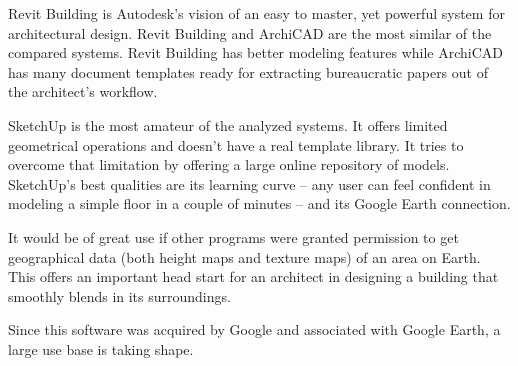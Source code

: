 Revit Building is Autodesk's vision of an easy to master,
yet powerful system for architectural design.
Revit Building and ArchiCAD are the most similar of the compared systems.
Revit Building has better modeling features while ArchiCAD has many document templates
ready for extracting bureaucratic papers out of the architect's workflow.

SketchUp is the most amateur of the analyzed systems.
It offers limited geometrical operations and doesn't have a real template library.
It tries to overcome that limitation by offering a large online repository of models.
SketchUp's best qualities are its learning curve
-- any user can feel confident in modeling a simple floor in a couple of minutes
-- and its Google Earth connection.

It would be of great use if other programs were granted permission to get geographical
data (both height maps and texture maps) of an area on Earth.
This offers an important head start for an architect in designing a building that
smoothly blends in its surroundings.

Since this software was acquired by Google and associated with Google Earth,
a large use base is taking shape.
